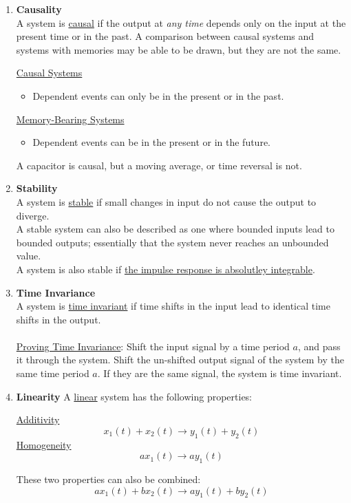 \documentclass{article}
\newcommand{\gap}{\medskip\\}
\begin{document}
\begin{enumerate}
    \item \textbf{Causality}\\
    A system is \underline{causal} if the output at \textit{any time} depends only on the input at the present time or in the past. A comparison between causal systems and systems with memories may be able to be drawn, but they are not the same.
    \begin{multicols}{2}
        \underline{Causal Systems}
        \begin{itemize}
            \item Dependent events can only be in the present or in the past.
        \end{itemize}
        \vfill\null\columnbreak
        \underline{Memory-Bearing Systems}
        \begin{itemize}
            \item Dependent events can be in the present or in the future.
        \end{itemize}
        \vfill\null
    \end{multicols}
    A capacitor is causal, but a moving average, or time reversal is not.
    \item \textbf{Stability}\\
    A system is \underline{stable} if small changes in input do not cause the output to diverge.\\
    A stable system can also be described as one where bounded inputs lead to bounded outputs; essentially that the system never reaches an unbounded value.\\
    A system is also stable if \underline{the impulse response is absolutley integrable}.
    \item \textbf{Time Invariance}\\
    A system is \underline{time invariant} if time shifts in the input lead to identical time shifts in the output.\\
    \gap
    \underline{Proving Time Invariance}: Shift the input signal by a time period $a$, and pass it through the system. Shift the un-shifted output signal of the system by the same time period $a$. If they are the same signal, the system is time invariant.
    \item \textbf{Linearity}
    A \underline{linear} system has the following properties:
    
    \begin{center}
        \begin{multicols}{2}
            \underline{Additivity}
            \[
                x_1(t) + x_2(t) \to y_1(t) + y_2(t)
            \]
            \vfill\null\columnbreak
            \underline{Homogeneity}
            \[
                ax_1(t) \to ay_1(t)
            \]
            \vfill\null
        \end{multicols}
    \end{center}
    
    These two properties can also be combined:
    \[
        ax_1(t) + bx_2(t) \to ay_1(t) + by_2(t)
    \]
    
\end{enumerate}
\end{document}
